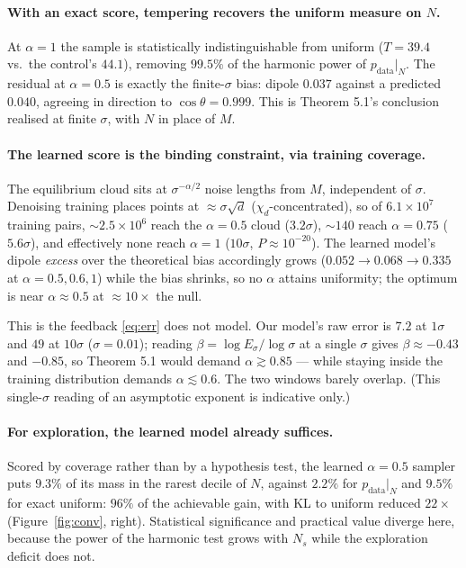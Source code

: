 \documentclass[10pt]{article}
\theoremstyle{definition}
\theoremstyle{plain}
\newcommand{\pdata}{p_{\mathrm{data}}}
\begin{document}
\paragraph{With an exact score, tempering recovers the uniform measure on $N$.}
At $\alpha = 1$ the sample is statistically indistinguishable from uniform
($T = 39.4$ vs.\ the control's $44.1$), removing $99.5\%$ of the harmonic power
of $\pdata|_N$. The residual at $\alpha = 0.5$ is exactly the finite-$\sigma$
bias: dipole $0.037$ against a predicted $0.040$, agreeing in direction to
$\cos\theta = 0.999$. This is Theorem 5.1's conclusion realised at finite
$\sigma$, with $N$ in place of $M$.

\paragraph{The learned score is the binding constraint, via training coverage.}
The equilibrium cloud sits at $\sigma^{-\alpha/2}$ noise lengths from $M$,
independent of $\sigma$. Denoising training places points at
${\approx}\sigma\sqrt{d}$ ($\chi_d$-concentrated), so of $6.1{\times}10^7$
training pairs, ${\sim}2.5{\times}10^6$ reach the $\alpha{=}0.5$ cloud
($3.2\sigma$), ${\sim}140$ reach $\alpha{=}0.75$ ($5.6\sigma$), and effectively
none reach $\alpha{=}1$ ($10\sigma$, $P \approx 10^{-20}$). The learned model's
dipole \emph{excess} over the theoretical bias accordingly grows
($0.052 \to 0.068 \to 0.335$ at $\alpha = 0.5, 0.6, 1$) while the bias shrinks,
so no $\alpha$ attains uniformity; the optimum is near $\alpha \approx 0.5$ at
${\approx}10\times$ the null.

This is the feedback \eqref{eq:err} does not model. Our model's raw error is
$7.2$ at $1\sigma$ and $49$ at $10\sigma$ ($\sigma = 0.01$); reading
$\beta = \log E_\sigma / \log \sigma$ at a single $\sigma$ gives $\beta \approx
-0.43$ and $-0.85$, so Theorem 5.1 would demand $\alpha \gtrsim 0.85$ --- while
staying inside the training distribution demands $\alpha \lesssim 0.6$. The two
windows barely overlap. (This single-$\sigma$ reading of an asymptotic exponent
is indicative only.)

\paragraph{For exploration, the learned model already suffices.}
Scored by coverage rather than by a hypothesis test, the learned $\alpha = 0.5$
sampler puts $9.3\%$ of its mass in the rarest decile of $N$, against $2.2\%$
for $\pdata|_N$ and $9.5\%$ for exact uniform: $96\%$ of the achievable gain,
with KL to uniform reduced $22\times$ (Figure~\ref{fig:conv}, right). Statistical
significance and practical value diverge here, because the power of the harmonic
test grows with $N_s$ while the exploration deficit does not.
\end{document}
